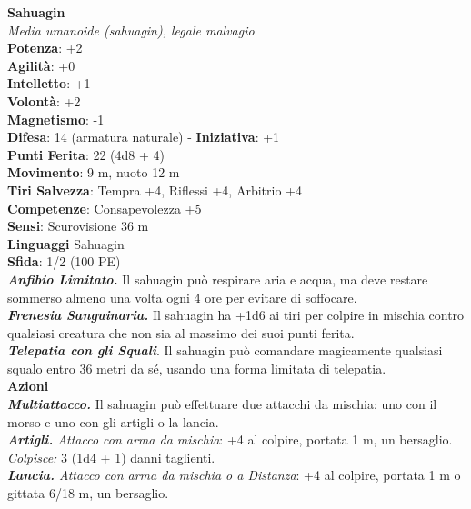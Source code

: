\begin{multicols}{2}
\medskip\textbf{Sahuagin}\\
\emph{Media umanoide (sahuagin), legale malvagio}\\
\textbf{Potenza}: +2\\
\textbf{Agilità}: +0\\
\textbf{Intelletto}: +1\\
\textbf{Volontà}: +2\\
\textbf{Magnetismo}: -1\\
\textbf{Difesa}: 14 (armatura naturale) - \textbf{Iniziativa}: +1\\
\textbf{Punti Ferita}: 22 (4d8 + 4)\\
\textbf{Movimento}: 9 m, nuoto 12 m\\
\textbf{Tiri Salvezza}: Tempra +4, Riflessi +4, Arbitrio +4\\
\textbf{Competenze}: Consapevolezza +5\\
\textbf{Sensi}: Scurovisione 36 m\\
\textbf{Linguaggi} Sahuagin\\
\textbf{Sfida}: 1/2 (100 PE)\smallskip\\
\emph{\textbf{Anfibio Limitato.}} Il sahuagin può respirare aria e acqua, ma deve restare sommerso almeno una volta ogni 4 ore per evitare di soffocare.\\

\emph{\textbf{Frenesia Sanguinaria.}} Il sahuagin ha +1d6 ai tiri per colpire in mischia contro qualsiasi creatura che non sia al massimo dei suoi punti ferita.\\

\emph{\textbf{Telepatia con gli Squali}}. Il sahuagin può comandare magicamente qualsiasi squalo entro 36 metri da sé, usando una forma limitata di telepatia.\\

\smallskip\textbf{Azioni}\\

\emph{\textbf{Multiattacco.}} Il sahuagin può effettuare due attacchi da mischia: uno con il morso e uno con gli artigli o la lancia.\\
\emph{\textbf{Artigli.} Attacco con arma da mischia}: +4 al colpire, portata 1 m, un bersaglio.\\
\emph{Colpisce:} 3 (1d4 + 1) danni taglienti.\\
\emph{\textbf{Lancia.} Attacco con arma da mischia o a Distanza}: +4 al colpire, portata 1 m o gittata 6/18 m, un bersaglio.\\


\end{multicols}
